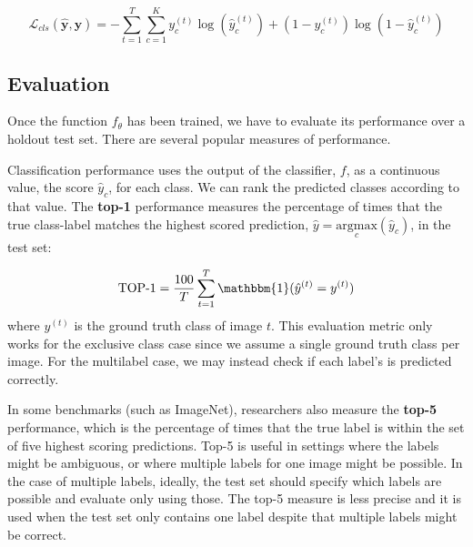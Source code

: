 \begin{equation}
    \mathcal{L}_{cls}(\hat{\mathbf{y}},\mathbf{y})
     = -\sum_{t=1}^{T} \sum_{c=1}^{K} y^{(t)}_c \log(\hat{y}^{(t)}_c)
     + 
     (1-y^{(t)}_c) \log(1-\hat{y}^{(t)}_c)
\end{equation}






\subsection{Evaluation}

Once the function $f_\theta$ has been trained, we have to evaluate its performance over a holdout test set. There are several popular measures of performance.

Classification performance uses the output of the classifier, $f$, as a continuous value, the score $\hat{y}_c$, for each class. We can rank the predicted classes according to that value. The {\bf top-1} performance measures the percentage of times that the true class-label matches the highest scored prediction, $\hat{y} = \underset{c}{\mathrm{argmax}} ( \hat{y}_c )$, in the test set: 

\begin{equation}
    \text{TOP-1} = \frac{100}{T}
    \sum_{t=1}^T \mathbbm{1}( \hat{y}^{(t)} = y^{(t)}) 
\end{equation}
where $y^{(t)}$ is the ground truth class of image $t$. This evaluation metric only works for the exclusive class case since we assume a single ground truth class per image. For the multilabel case, we may instead check if each label's is predicted correctly.

In some benchmarks (such as ImageNet), researchers also measure the {\bf top-5} performance, which is the percentage of times that the true label is within the set of five highest scoring predictions. Top-5 is useful in settings where the labels might be ambiguous, or where multiple labels for one image might be possible. In the case of multiple labels, ideally, the test set should specify which labels are possible and evaluate only using those. The top-5 measure is less precise and it is used when the test set only contains one label despite that multiple labels might be correct. 


